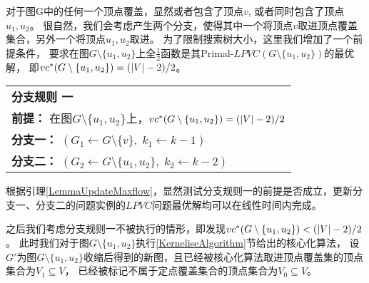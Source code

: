 对于图G中的任何一个顶点覆盖，显然或者包含了顶点$v$, 或者同时包含了顶点$u_1, u_2$。
很自然，我们会考虑产生两个分支，使得其中一个将顶点$v$取进顶点覆盖集合，另外一个将顶点$u_1, u_2$取进。
为了限制搜索树大小，这里我们增加了一个前提条件，
要求在图$G \setminus \{u_1, u_2\}$上全$\frac{1}{2}$函数是其Primal-$LPVC(G \setminus \{u_1, u_2\})$的最优解，
即$vc^*(G \setminus \{u_1, u_2\}) = (\left\vert V \right\vert - 2) / 2$。\\

\begin{tabular}{ p{0.9\headwidth} }
  \hline
  \textbf{分支规则 一 }\\
  \textbf{前提：}  在图$G \setminus \{u_1, u_2\}$上，$vc^*(G \setminus \{u_1, u_2\}) = (\left\vert V \right\vert - 2) / 2$\\
  \textbf{分支一：} $(G_1 \leftarrow G \setminus \{v\},\; k_1 \leftarrow k - 1)$\\
  \textbf{分支二：} $(G_2 \leftarrow G \setminus \{u_1, u_2\},\; k_2 \leftarrow k - 2)$\\
  \hline
\end{tabular} \vspace{0.5cm}

根据引理\ref{LemmaUpdateMaxflow}，显然测试分支规则一的前提是否成立，更新分支一、分支二的问题实例的$LPVC$问题最优解均可以在线性时间内完成。

之后我们考虑分支规则一不被执行的情形，即发现$vc^*(G \setminus \{u_1, u_2\}) < (\left\vert V \right\vert - 2) / 2$。
此时我们对于图$G \setminus \{u_1, u_2\}$执行\ref{KerneliseAlgorithm}节给出的核心化算法，
设$G'$为图$G\setminus\{u_1, u_2\}$收缩后得到的新图，且已经被核心化算法取进顶点覆盖集的顶点集合为$V_1 \subseteq V$，
已经被标记不属于定点覆盖集合的顶点集合为$V_0 \subseteq V$。

